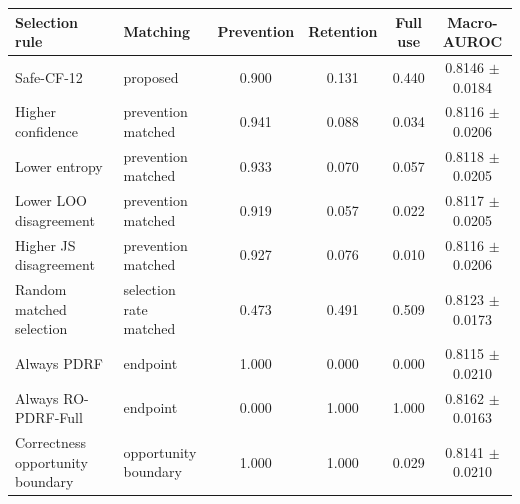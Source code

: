 \begin{tabular}{llcccc}
\toprule
Selection rule & Matching & Prevention & Retention & Full use & Macro-AUROC \\
\midrule
Safe-CF-12 & proposed & 0.900 & 0.131 & 0.440 & 0.8146 $\pm$ 0.0184 \\
Higher confidence & prevention matched & 0.941 & 0.088 & 0.034 & 0.8116 $\pm$ 0.0206 \\
Lower entropy & prevention matched & 0.933 & 0.070 & 0.057 & 0.8118 $\pm$ 0.0205 \\
Lower LOO disagreement & prevention matched & 0.919 & 0.057 & 0.022 & 0.8117 $\pm$ 0.0205 \\
Higher JS disagreement & prevention matched & 0.927 & 0.076 & 0.010 & 0.8116 $\pm$ 0.0206 \\
Random matched selection & selection rate matched & 0.473 & 0.491 & 0.509 & 0.8123 $\pm$ 0.0173 \\
Always PDRF & endpoint & 1.000 & 0.000 & 0.000 & 0.8115 $\pm$ 0.0210 \\
Always RO-PDRF-Full & endpoint & 0.000 & 1.000 & 1.000 & 0.8162 $\pm$ 0.0163 \\
Correctness opportunity boundary & opportunity boundary & 1.000 & 1.000 & 0.029 & 0.8141 $\pm$ 0.0210 \\
\bottomrule
\end{tabular}
